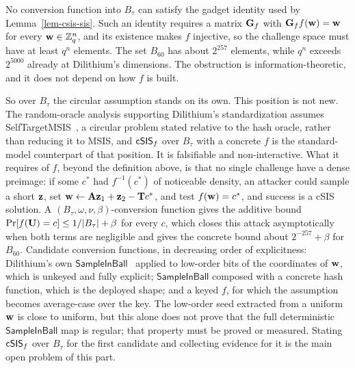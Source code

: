 No conversion function into $B_\tau$ can satisfy the gadget identity used by Lemma~\ref{lem-csis-sis}. Such an identity requires a matrix $\mathbf{G}_f$ with $\mathbf{G}_f f(\mathbf{w}) = \mathbf{w}$ for every $\mathbf{w} \in \mathbb{Z}_q^n$, and its existence makes $f$ injective, so the challenge space must have at least $q^n$ elements. The set $B_{60}$ has about $2^{257}$ elements, while $q^n$ exceeds $2^{5000}$ already at Dilithium's dimensions. The obstruction is information-theoretic, and it does not depend on how $f$ is built.

So over $B_\tau$ the circular assumption stands on its own. This position is not new. The random-oracle analysis supporting Dilithium's standardization assumes SelfTargetMSIS~\cite{EC:KilLyuSch18}, a circular problem stated relative to the hash oracle, rather than reducing it to MSIS, and $\mathsf{cSIS}_f$ over $B_\tau$ with a concrete $f$ is the standard-model counterpart of that position. It is falsifiable and non-interactive. What it requires of $f$, beyond the definition above, is that no single challenge have a dense preimage: if some $c^*$ had $f^{-1}(c^*)$ of noticeable density, an attacker could sample a short $\mathbf{z}$, set $\mathbf{w} \gets \mathbf{A}\mathbf{z}_1 + \mathbf{z}_2 - \mathbf{T}c^*$, and test $f(\mathbf{w}) = c^*$, and success is a cSIS solution. A $(B_\tau,\omega,\nu,\beta)$-conversion function gives the additive bound $\Pr[f(\mathbf{U})=c]\le 1/|B_\tau|+\beta$ for every $c$, which closes this attack asymptotically when both terms are negligible and gives the concrete bound about $2^{-257}+\beta$ for $B_{60}$. Candidate conversion functions, in decreasing order of explicitness: Dilithium's own $\mathsf{SampleInBall}$~\cite{Dilithium} applied to low-order bits of the coordinates of $\mathbf{w}$, which is unkeyed and fully explicit; $\mathsf{SampleInBall}$ composed with a concrete hash function, which is the deployed shape; and a keyed $f$, for which the assumption becomes average-case over the key. The low-order seed extracted from a uniform $\mathbf{w}$ is close to uniform, but this alone does not prove that the full deterministic $\mathsf{SampleInBall}$ map is regular; that property must be proved or measured. Stating $\mathsf{cSIS}_f$ over $B_\tau$ for the first candidate and collecting evidence for it is the main open problem of this part.

